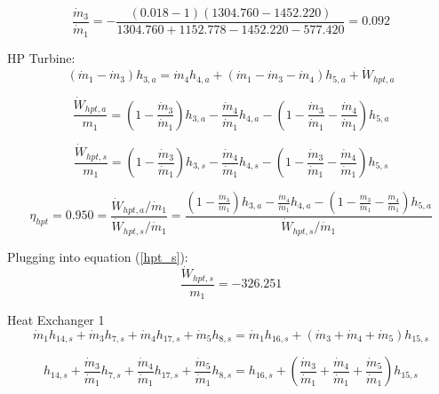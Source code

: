\documentclass{article}
\begin{document}
\begin{equation}
\frac{\dot{m}_{3}}{\dot{m}_{1}} = -\frac{(   0.018 - 1)(1304.760 - 1452.220)}{1304.760 + 1152.778 - 1452.220 -  577.420} =    0.092
\end{equation}


HP Turbine:
\begin{equation}
(\dot{m}_{ 1} - \dot{m}_{ 3})h_{ 3,a} = \dot{m}_{ 4}h_{ 4,a} + (\dot{m}_{ 1} - \dot{m}_{ 3} - \dot{m}_{ 4})h_{ 5,a} + \dot{W}_{hpt,a}
\end{equation}

\begin{equation}
\frac{\dot{W}_{hpt,a}}{m_1} = (1 - \frac{\dot{m}_{ 3}}{\dot{m}_{ 1}})h_{ 3,a} - \frac{\dot{m}_{ 4}}{\dot{m}_{ 1}}h_{ 4,a} - (1 - \frac{\dot{m}_{ 3}}{\dot{m}_{ 1}} - \frac{\dot{m}_{ 4}}{\dot{m}_{ 1}})h_{ 5,a}\end{equation}

\begin{equation}\label{hpt_s}
\frac{\dot{W}_{hpt,s}}{m_1} = (1 - \frac{\dot{m}_{ 3}}{\dot{m}_{ 1}})h_{ 3,s} - \frac{\dot{m}_{ 4}}{\dot{m}_{ 1}}h_{ 4,s} - (1 - \frac{\dot{m}_{ 3}}{\dot{m}_{ 1}} - \frac{\dot{m}_{ 4}}{\dot{m}_{ 1}})h_{ 5,s}\end{equation}

\begin{equation}
\eta_{hpt} =    0.950 = \frac{\dot{W}_{hpt,a} / \dot{m}_{1}}{\dot{W}_{hpt,s} / \dot{m}_{1}} = \frac{
(1 - \frac{\dot{m}_{ 3}}{\dot{m}_{ 1}})h_{ 3,a} - \frac{\dot{m}_{ 4}}{\dot{m}_{ 1}}h_{ 4,a} - (1 - \frac{\dot{m}_{ 3}}{\dot{m}_{ 1}} - \frac{\dot{m}_{ 4}}{\dot{m}_{ 1}})h_{ 5,a}}{\dot{W}_{hpt,s} / \dot{m}_{1}}
\end{equation}


Plugging into equation (\ref{hpt_s}):
\begin{equation}
\frac{\dot{W}_{hpt,s}}{m_1} = -326.251
\end{equation}


Heat Exchanger 1
\begin{equation}
\dot{m}_{ 1}h_{14,s} + \dot{m}_{ 3}h_{ 7,s} + \dot{m}_{ 4}h_{17,s} + \dot{m}_{ 5}h_{ 8,s} = \dot{m}_{ 1}h_{16,s} + (\dot{m}_{ 3} + \dot{m}_{ 4} + \dot{m}_{ 5})h_{15,s}
\end{equation}

\begin{equation}
h_{14,s} + \frac{\dot{m}_{ 3}}{\dot{m}_{ 1}}h_{ 7,s} + \frac{\dot{m}_{ 4}}{\dot{m}_{ 1}}h_{17,s} + \frac{\dot{m}_{ 5}}{\dot{m}_{ 1}}h_{ 8,s} = h_{16,s} + (\frac{\dot{m}_{ 3}}{\dot{m}_{ 1}} + \frac{\dot{m}_{ 4}}{\dot{m}_{ 1}} + \frac{\dot{m}_{ 5}}{\dot{m}_{ 1}})h_{15,s}
\end{equation}
\end{document}
